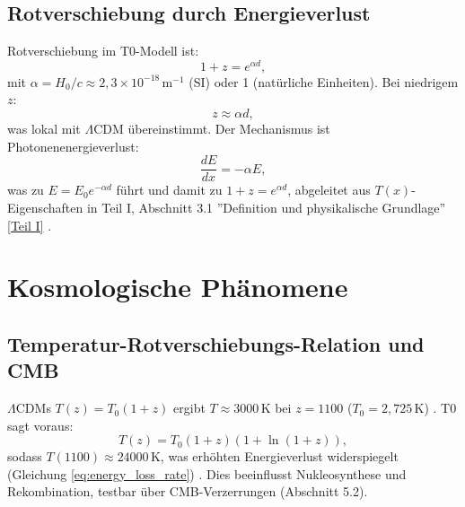 \documentclass[twocolumn,aps,prl]{revtex4-2}
\newcommand{\Tfield}{T(x)}
\newcommand{\LCDM}{\Lambda\text{CDM}}
\begin{document}
	\subsection{Rotverschiebung durch Energieverlust}
	\label{subsec:redshift_energy_loss}
	
	Rotverschiebung im T0-Modell ist:
	\begin{equation}
		1 + z = e^{\alpha d},
		\label{eq:redshift_distance}
	\end{equation}
	mit \(\alpha = H_0 / c \approx 2,3 \times 10^{-18} \, \text{m}^{-1}\) (SI) oder 1 (natürliche Einheiten). Bei niedrigem \(z\):
	\begin{equation}
		z \approx \alpha d,
		\label{eq:hubble_approx}
	\end{equation}
	was lokal mit \(\LCDM\) übereinstimmt. Der Mechanismus ist Photonenenergieverlust:
	\begin{equation}
		\frac{dE}{dx} = -\alpha E,
		\label{eq:energy_loss_rate}
	\end{equation}
	was zu \(E = E_0 e^{-\alpha d}\) führt und damit zu \(1 + z = e^{\alpha d}\), abgeleitet aus \(\Tfield\)-Eigenschaften in Teil I, Abschnitt 3.1 ''Definition und physikalische Grundlage'' \href{https://github.com/jpascher/T0-Time-Mass-Duality/tree/main/2/pdf/Deutsch/QMRelTimeMassPart1.pdf}{[Teil I]} \cite{pascher_messdifferenzen_2025}.
	
	\section{Kosmologische Phänomene}
	\label{sec:cosmological_phenomena}
	
	\subsection{Temperatur-Rotverschiebungs-Relation und CMB}
	\label{subsec:cmb_temp}
	
	\(\LCDM\)s \(T(z) = T_0 (1 + z)\) ergibt \(T \approx 3000 \, \text{K}\) bei \(z = 1100\) (\(T_0 = 2,725 \, \text{K}\)) \cite{Fixsen2009}. T0 sagt voraus:
	\begin{equation}
		T(z) = T_0 (1 + z) (1 + \ln(1 + z)),
		\label{eq:temperature_redshift_simplified}
	\end{equation}
	sodass \(T(1100) \approx 24000 \, \text{K}\), was erhöhten Energieverlust widerspiegelt (Gleichung \ref{eq:energy_loss_rate}) \cite{pascher_temp_2025}. Dies beeinflusst Nukleosynthese und Rekombination, testbar über CMB-Verzerrungen (Abschnitt 5.2).
	
\end{document}
